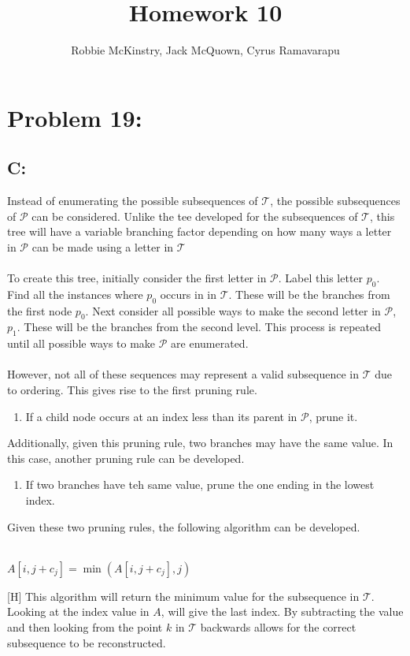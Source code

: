 \documentclass[12pt]{article}
\begin{document}
\title{Homework 10}
\author{Robbie McKinstry, Jack McQuown, Cyrus Ramavarapu}
\renewcommand{\today}{26 September 2016}
\renewcommand{\baselinestretch}{1.5}
\maketitle

\section*{Problem 19: }
\subsection*{C:}
Instead of enumerating the possible subsequences of $\mathcal{T}$, the
possible subsequences of $\mathcal{P}$ can be considered.  Unlike
the tee developed for the subsequences of $\mathcal{T}$, this tree
will have a variable branching factor depending on how many ways a 
letter in $\mathcal{P}$ can be made using a letter in $\mathcal{T}$\\\\
To create this tree, initially consider the first letter in $\mathcal{P}$. 
Label this letter $p_0$.  Find all the instances where $p_0$ occurs in
in $\mathcal{T}$.  These will be the branches from the first node $p_0$.
Next consider all possible ways to make the second letter in $\mathcal{P}$,
$p_1$.  These will be the branches from the second level.  This process
is repeated until all possible ways to make $\mathcal{P}$ are enumerated.\\\\
However, not all of these sequences may represent a valid subsequence in
$\mathcal{T}$ due to ordering.  This gives rise to the first pruning rule.
\begin{enumerate}
\item If a child node occurs at an index less than its parent in $\mathcal{P}$,
      prune it.
\end{enumerate}
Additionally, given this pruning rule, two branches may have the same value.  In
this case, another pruning rule can be developed.
\begin{enumerate}
\item If two branches have teh same value, prune the one ending in the lowest index.
\end{enumerate}
Given these two pruning rules, the following algorithm can be developed.
\begin{algorithm}[H]
\\
{
    {
        {
            $A[i,j+c_j]=\min(A[i,j+c_j], j)$
        }
    }
}
\end{algorithm}[H]
This algorithm will return the minimum value for the subsequence in $\mathcal{T}$.
Looking at the index value in $A$, will give the last index.  By subtracting the value
and then looking from the point $k$ in $\mathcal{T}$ backwards allows for the correct
subsequence to be reconstructed.         
\end{document}
